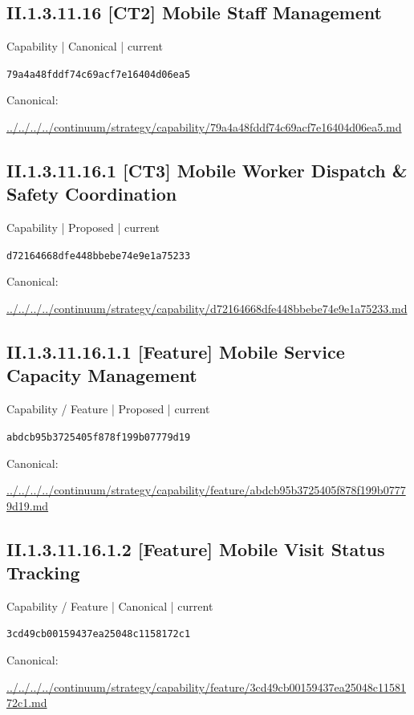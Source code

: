 \documentclass[10pt,a4paper]{article}
\begin{document}
\subsection*{II.1.3.11.16 [CT2] Mobile Staff Management}
{\small Capability | Canonical | current}\par
\texttt{79a4a48fddf74c69acf7e16404d06ea5}\par
Canonical: \par
{\footnotesize\url{../../../../continuum/strategy/capability/79a4a48fddf74c69acf7e16404d06ea5.md}}\par
\subsection*{II.1.3.11.16.1 [CT3] Mobile Worker Dispatch \& Safety Coordination}
{\small Capability | Proposed | current}\par
\texttt{d72164668dfe448bbebe74e9e1a75233}\par
Canonical: \par
{\footnotesize\url{../../../../continuum/strategy/capability/d72164668dfe448bbebe74e9e1a75233.md}}\par
\subsection*{II.1.3.11.16.1.1 [Feature] Mobile Service Capacity Management}
{\small Capability / Feature | Proposed | current}\par
\texttt{abdcb95b3725405f878f199b07779d19}\par
Canonical: \par
{\footnotesize\url{../../../../continuum/strategy/capability/feature/abdcb95b3725405f878f199b07779d19.md}}\par
\subsection*{II.1.3.11.16.1.2 [Feature] Mobile Visit Status Tracking}
{\small Capability / Feature | Canonical | current}\par
\texttt{3cd49cb00159437ea25048c1158172c1}\par
Canonical: \par
{\footnotesize\url{../../../../continuum/strategy/capability/feature/3cd49cb00159437ea25048c1158172c1.md}}\par
\end{document}
